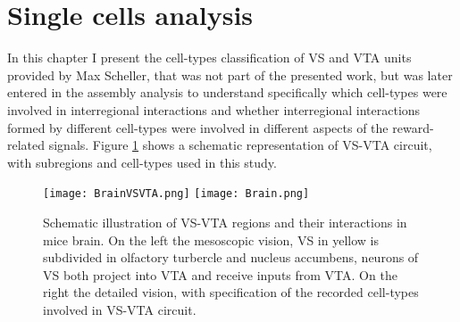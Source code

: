
\section{Single cells analysis}
\label{chap:UnitsAnalysis}
In this chapter I present the cell-types classification of VS and VTA units provided by Max Scheller, that was not part of the presented work, but was later entered in the assembly analysis to understand specifically which cell-types were involved in interregional interactions and whether interregional interactions formed by different cell-types were involved in different aspects of the reward-related signals. Figure \ref{fig:Brain} shows a schematic representation of VS-VTA circuit, with subregions and cell-types used in this study.\\
\begin{figure}[H]
    \centering
    \texttt{[image: BrainVSVTA.png]}
    \hspace{1cm}
    \texttt{[image: Brain.png]}
    \caption{Schematic illustration of VS-VTA regions and their interactions in mice brain. On the left the mesoscopic vision, VS in yellow is subdivided in olfactory turbercle and nucleus accumbens, neurons of VS both project into VTA and receive inputs from VTA. On the right the detailed vision, with specification of the recorded cell-types involved in VS-VTA circuit.}
    \label{fig:Brain}
\end{figure}
